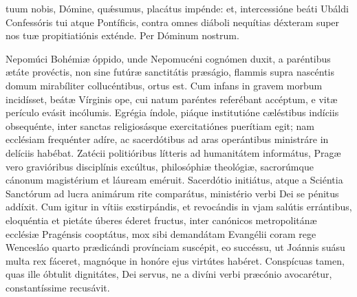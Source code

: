 \documentclass[fontsize=9pt,paper=A6,twoside,BCOR=1mm,DIV=22,headinclude]{scrarticle}
\begin{document}
\begin{multicols}{2}

\AiCPA 

\VRCPiA

 tuum nobis, Dómine, quǽsumus, placátus impénde: et, intercessióne beáti Ubáldi Confessóris tui atque Pontíficis, contra omnes diáboli nequítias déxteram super nos tuæ propitiatiónis exténde. Per Dóminum nostrum.

 Nepomúci Bohémiæ óppido, unde Nepomucéni cognómen duxit, a paréntibus ætáte provéctis, non sine futúræ sanctitátis præságio, flammis supra nascéntis domum mirabíliter collucéntibus, ortus est. Cum infans in gravem morbum incidísset, beátæ Vírginis ope, cui natum paréntes referébant accéptum, e vitæ perículo evásit incólumis. Egrégia índole, piáque institutióne cæléstibus indíciis obsequénte, inter sanctas religiosásque exercitatiónes puerítiam egit; nam ecclésiam frequénter adíre, ac sacerdótibus ad aras operántibus ministráre in delíciis habébat. Zatécii politióribus lítteris ad humanitátem informátus, Pragæ vero gravióribus disciplínis excúltus, philosóphiæ theológiæ, sacrorúmque cánonum magistérium et láuream eméruit. Sacerdótio initiátus, atque a Sciéntia Sanctórum ad lucra animárum rite comparátus, ministério verbi Dei se pénitus addíxit. Cum igitur in vítiis exstirpándis, et revocándis in vjam salútis errántibus, eloquéntia et pietáte úberes éderet fructus, inter canónicos metropolitánæ ecclésiæ Pragénsis cooptátus, mox sibi demandátam Evangélii coram rege Wencesláo quarto prædicándi provínciam suscépit, eo succéssu, ut Joánnis suásu multa rex fáceret, magnóque in honóre ejus virtútes habéret. Conspícuas tamen, quas ille óbtulit dignitátes, Dei servus, ne a divíni verbi præcónio avocarétur, constantíssime recusávit.

{

\RVMTPiv 

}
\end{multicols}
\end{document}
